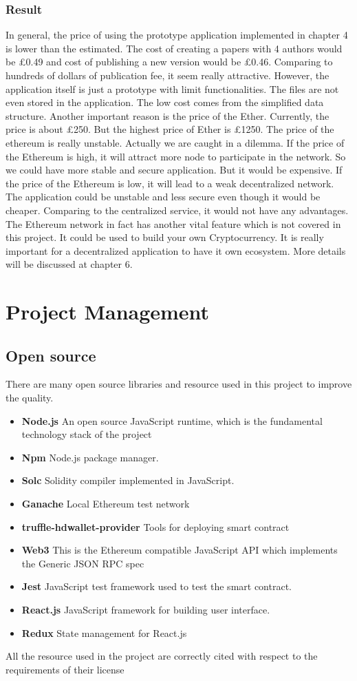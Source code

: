 \documentclass[openany,12pt]{ecsthesis}      %
\begin{document}
\subsubsection{Result}
In general, the price of using the prototype application implemented in chapter 4 is lower than the estimated.
The cost of creating a papers with 4 authors would be £0.49 and cost of publishing a new version would be £0.46.
Comparing to hundreds of dollars of publication fee, it seem really attractive. 
However, the application itself is just a prototype with limit functionalities. 
The files are not even stored in the application. 
The low cost comes from the simplified data structure. 
Another important reason is the price of the Ether. Currently, the price is about £250. 
But the highest price of Ether is £1250. The price of the ethereum is really unstable.
Actually we are caught in a dilemma. If the price of the Ethereum is high, 
it will attract more node to participate in the network. 
So we could have more stable and secure application. But it would be expensive.
If the price of the Ethereum is low, it will lead to a weak decentralized network.
The application could be unstable and less secure even though it would be cheaper. 
Comparing to the centralized service, it would not have any advantages. 
The Ethereum network in fact has another vital feature which is not covered in this project.
It could be used to build your own Cryptocurrency. 
It is really important for a decentralized application to have it own ecosystem. More details will be discussed at chapter 6.
\section{Project Management}
\subsection{Open source}
There are many open source libraries and resource used in this project to improve the quality.
\begin{itemize}
  \item \textbf{Node.js} An open source JavaScript runtime, which is the fundamental technology stack of the project
  \item \textbf{Npm} Node.js package manager.
  \item \textbf{Solc} Solidity compiler implemented in JavaScript.
  \item \textbf{Ganache} Local Ethereum test network
  \item \textbf{truffle-hdwallet-provider} Tools for deploying smart contract
  \item \textbf{Web3} This is the Ethereum compatible JavaScript API which implements the Generic JSON RPC spec
  \item \textbf{Jest} JavaScript test framework used to test the smart contract.
  \item \textbf{React.js} JavaScript framework for building user interface.
  \item \textbf{Redux} State management for React.js
\end{itemize}
All the resource used in the project are correctly cited with respect to the requirements of their license
\end{document}

